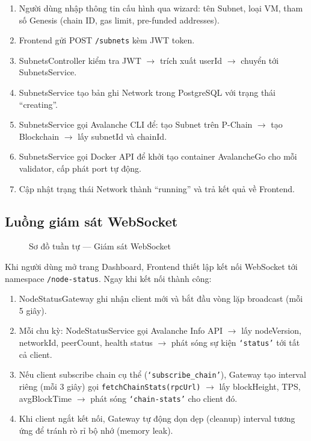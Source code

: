 \begin{enumerate}
    \item Người dùng nhập thông tin cấu hình qua wizard: tên Subnet, loại VM, tham số Genesis (chain ID, gas limit, pre-funded addresses).
    \item Frontend gửi POST \texttt{/subnets} kèm JWT token.
    \item SubnetsController kiểm tra JWT $\rightarrow$ trích xuất userId $\rightarrow$ chuyển tới SubnetsService.
    \item SubnetsService tạo bản ghi Network trong PostgreSQL với trạng thái ``creating''.
    \item SubnetsService gọi Avalanche CLI để: tạo Subnet trên P-Chain $\rightarrow$ tạo Blockchain $\rightarrow$ lấy subnetId và chainId.
    \item SubnetsService gọi Docker API để khởi tạo container AvalancheGo cho mỗi validator, cấp phát port tự động.
    \item Cập nhật trạng thái Network thành ``running'' và trả kết quả về Frontend.
\end{enumerate}

\subsection{Luồng giám sát WebSocket}

\begin{figure}[H]
\centering
{}
\caption{Sơ đồ tuần tự --- Giám sát WebSocket}
\label{fig:seq_websocket}
\end{figure}

Khi người dùng mở trang Dashboard, Frontend thiết lập kết nối WebSocket tới namespace \texttt{/node-status}. Ngay khi kết nối thành công:

\begin{enumerate}
    \item NodeStatusGateway ghi nhận client mới và bắt đầu vòng lặp broadcast (mỗi 5 giây).
    \item Mỗi chu kỳ: NodeStatusService gọi Avalanche Info API $\rightarrow$ lấy nodeVersion, networkId, peerCount, health status $\rightarrow$ phát sóng sự kiện \texttt{`status'} tới tất cả client.
    \item Nếu client subscribe chain cụ thể (\texttt{`subscribe\_chain'}), Gateway tạo interval riêng (mỗi 3 giây) gọi \texttt{fetchChainStats(rpcUrl)} $\rightarrow$ lấy blockHeight, TPS, avgBlockTime $\rightarrow$ phát sóng \texttt{`chain-stats'} cho client đó.
    \item Khi client ngắt kết nối, Gateway tự động dọn dẹp (cleanup) interval tương ứng để tránh rò rỉ bộ nhớ (memory leak).
\end{enumerate}
